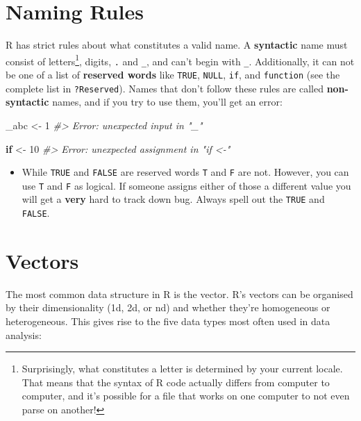 \documentclass[]{book}
\newenvironment{Shaded}{\begin{snugshade}}{\end{snugshade}}
\newcommand{\CommentTok}[1]{\textcolor[rgb]{0.56,0.35,0.01}{\textit{#1}}}
\newcommand{\ControlFlowTok}[1]{\textcolor[rgb]{0.13,0.29,0.53}{\textbf{#1}}}
\newcommand{\DecValTok}[1]{\textcolor[rgb]{0.00,0.00,0.81}{#1}}
\newcommand{\NormalTok}[1]{#1}
\newcommand{\StringTok}[1]{\textcolor[rgb]{0.31,0.60,0.02}{#1}}
\let\rmarkdownfootnote\footnote%
\def\footnote{\protect\rmarkdownfootnote}
\newenvironment{rmdblock}[1]
  {\begin{shaded*}
  \begin{itemize}
  \renewcommand{\labelitemi}{
    \raisebox{-.7\height}[0pt][0pt]{
      {\setkeys{Gin}{width=3em,keepaspectratio}\texttt{[image: images/\#1]}}
    }
  }
  \item
  }
  {
  \end{itemize}
  \end{shaded*}
  }
\newenvironment{rmdwarning}
  {\begin{rmdblock}{warning}}
  {\end{rmdblock}}
\theoremstyle{definition}
\theoremstyle{definition}
\theoremstyle{definition}
\theoremstyle{remark}
\begin{document}
\hypertarget{naming-rules}{%
\section{Naming Rules}\label{naming-rules}}

R has strict rules about what constitutes a valid name. A
\textbf{syntactic} name must consist of letters\footnote{Surprisingly,
  what constitutes a letter is determined by your current locale. That
  means that the syntax of R code actually differs from computer to
  computer, and it's possible for a file that works on one computer to
  not even parse on another!}, digits, \texttt{.} and \texttt{\_}, and
can't begin with \texttt{\_}. Additionally, it can not be one of a list
of \textbf{reserved words} like \texttt{TRUE}, \texttt{NULL},
\texttt{if}, and \texttt{function} (see the complete list in
\texttt{?Reserved}). Names that don't follow these rules are called
\textbf{non-syntactic} names, and if you try to use them, you'll get an
error:

\begin{Shaded}
\begin{Highlighting}[]
\NormalTok{_abc <-}\StringTok{ }\DecValTok{1}
\CommentTok{#> Error: unexpected input in "_"}

\ControlFlowTok{if}\NormalTok{ <-}\StringTok{ }\DecValTok{10}
\CommentTok{#> Error: unexpected assignment in "if <-"}
\end{Highlighting}
\end{Shaded}

\begin{rmdwarning}
While \texttt{TRUE} and \texttt{FALSE} are reserved words \texttt{T} and
\texttt{F} are not. However, you can use \texttt{T} and \texttt{F} as
logical. If someone assigns either of those a different value you will
get a \textbf{very} hard to track down bug. Always spell out the
\texttt{TRUE} and \texttt{FALSE}.
\end{rmdwarning}

\hypertarget{vectors}{%
\section{Vectors}\label{vectors}}

The most common data structure in R is the vector. R's vectors can be
organised by their dimensionality (1d, 2d, or nd) and whether they're
homogeneous or heterogeneous. This gives rise to the five data types
most often used in data analysis:
\end{document}
